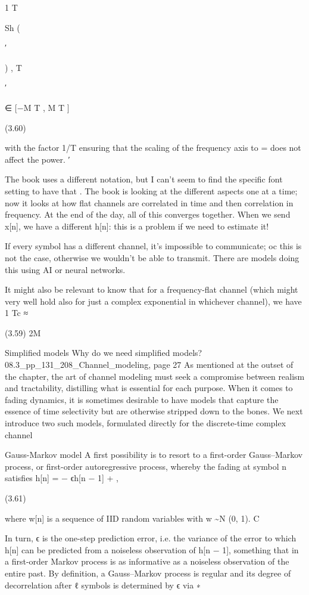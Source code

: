 {{{{1 T

\nu Sh (

′

) ,
T

\nu

′

∈ [−\nu M T , \nu M T ]

(3.60)

with the factor 1/T ensuring that the scaling of the frequency axis \nu to \nu = \nuT does not affect the power.
′

The book uses a different notation, but I can't seem to find the specific font setting to have that \nu .
The book is looking at the different aspects one at a time; now it looks at how flat channels are correlated in time and then correlation in frequency. At the end of the day,
all of this converges together.
When we send x[n], we have a different h[n]: this is a problem if we need to estimate it!

If every symbol has a different channel, it's impossible to communicate; oc this is not the case, otherwise we wouldn't be able to transmit.
There are models doing this using AI or neural networks.

It might also be relevant to know that for a frequency-flat channel (which might very well hold also for just a complex exponential in whichever channel), we have 1 Tc ≈

(3.59)
2\nu M

Simplified models Why do we need simplified models?
08.3_pp_131_208_Channel_modeling, page 27 As mentioned at the outset of the chapter, the art of channel modeling must seek a compromise between realism and tractability, distilling what is essential for each purpose. When it comes to fading dynamics, it is sometimes desirable to have models that capture the essence of time selectivity but are otherwise stripped down to the bones. We next introduce two such models, formulated directly for the discrete-time complex channel

Gauss-Markov model A first possibility is to resort to a first-order Gauss–Markov process, or first-order autoregressive process, whereby the fading at symbol n satisfies h[n] =  − ϵh[n − 1] +  ,

(3.61)

where {w[n]} is a sequence of IID random variables with w \sim N (0, 1).
C

In turn, ϵ is the one-step prediction error, i.e. the variance of the error to which h[n]
can be predicted from a noiseless observation of h[n − 1], something that in a first-order Markov process is as informative as a noiseless observation of the entire past. By definition, a Gauss–Markov process is regular and its degree of decorrelation after ℓ symbols is determined by ϵ via
∗

}}}}
